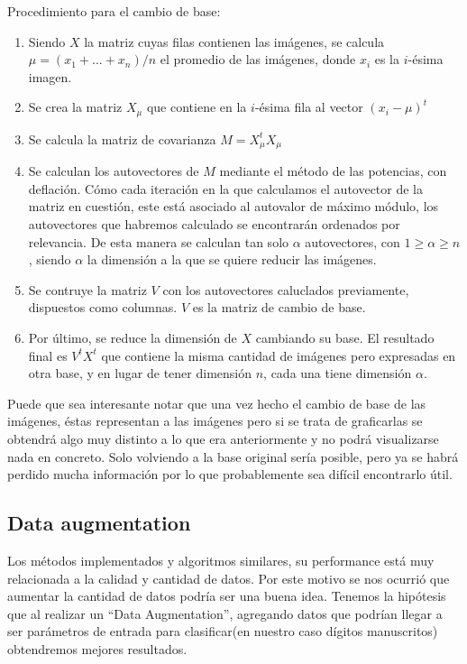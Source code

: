 \bigskip

Procedimiento para el cambio de base:

\begin{enumerate}
\item Siendo $X$ la matriz cuyas filas contienen las imágenes, se calcula $\mu = (x_1 + ... + x_n)/n$ el promedio de las imágenes, donde $x_i$ es la $i$-ésima imagen.
\item Se crea la matriz $X_\mu$ que contiene en la $i$-ésima fila al vector $(x_i - \mu)^t$
\item Se calcula la matriz de covarianza $M = X_\mu^tX_\mu$
\item Se calculan los autovectores de $M$ mediante el método de las potencias, con deflación. Cómo cada iteración en la que calculamos el autovector de la matriz en cuestión, este está asociado al autovalor de máximo módulo, los autovectores que habremos calculado se encontrarán ordenados por relevancia. De esta manera se calculan tan solo $\alpha$ autovectores, con $1 \geq \alpha \geq n$, siendo $\alpha$ la dimensión a la que se quiere reducir las imágenes.
\item Se contruye la matriz $V$ con los autovectores caluclados previamente, dispuestos como columnas. $V$ es la matriz de cambio de base.
\item Por último, se reduce la dimensión de $X$ cambiando su base. El resultado final es $V^tX^t$ que contiene la misma cantidad de imágenes pero expresadas en otra base, y en lugar de tener dimensión $n$, cada una tiene dimensión $\alpha$.
\end{enumerate}\tabularnewline

Puede que sea interesante notar que una vez hecho el cambio de base de las imágenes, éstas representan a las imágenes pero si se trata de graficarlas se obtendrá algo muy distinto a lo que era anteriormente y no podrá visualizarse nada en concreto. Solo volviendo a la base original sería posible, pero ya se habrá perdido mucha información por lo que probablemente sea difícil encontrarlo útil.

\subsection{Data augmentation}

Los métodos implementados y algoritmos similares, su performance está muy relacionada a la calidad y cantidad de datos. Por este motivo se nos ocurrió que aumentar la cantidad de datos podría ser una buena idea. Tenemos la hipótesis que al realizar un “Data Augmentation”, agregando datos que podrían llegar a ser parámetros de entrada para clasificar(en nuestro caso dígitos manuscritos) obtendremos mejores resultados.

